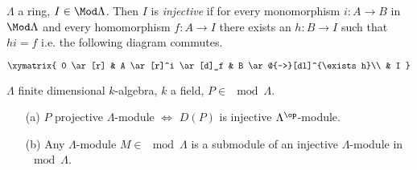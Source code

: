 \begin{defin}
$\Lambda$ a ring, $I \in \Mod\Lambda$. Then $I$ is
\emph{injective} if for every monomorphism $i\colon A \to B$ in
$\Mod\Lambda$ and every homomorphism $f\colon A \to I$ there exists an
$h:B\to I$ such that $hi = f$ i.e. the following diagram commutes. 

\[\xymatrix{
0 \ar[r] & A \ar[r]^i \ar[d]_f & B \ar@{-->}[dl]^{\exists h}\\
& I
}\]
\end{defin}

\begin{prop}
\label{prop:53}
$\Lambda$ finite dimensional $k$-algebra, $k$ a field, $P \in \mod \Lambda$.
\begin{enumerate}
\item[(a)] $P$ projective $\Lambda$-module $\iff$ $D(P)$ is injective $\Lambda^{\op}$-module.

\item[(b)] Any $\Lambda$-module $M \in \mod\Lambda$ is a submodule of
  an injective $\Lambda$-module in $\mod\Lambda$. 
\end{enumerate}
\end{prop}
